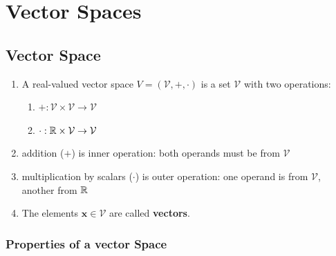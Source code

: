 \chapter{Vector Spaces}


\section{Vector Space}

\begin{enumerate}
    \item
    \begin{definition}
        A real-valued vector space $V = (\mathcal{V}, +, \cdot)$ is a set $\mathcal{V}$ with two operations:
        \hfill \cite{mfml/book/mml/Deisenroth-Faisal-Ong}
        \begin{enumerate}
            \item[] $+ :  \mathcal{V} \times \mathcal{V} \to \mathcal{V}$
            \hfill \cite{mfml/book/mml/Deisenroth-Faisal-Ong}

            \item[] $\cdot: \mathbb{R} \times \mathcal{V} \to \mathcal{V}$
            \hfill \cite{mfml/book/mml/Deisenroth-Faisal-Ong}
        \end{enumerate}
    \end{definition}


    \item addition ($+$) is inner operation: both operands must be from $\mathcal{V}$
    \hfill \cite{mfml/book/mml/Deisenroth-Faisal-Ong}

    \item multiplication by scalars ($\cdot$) is outer operation: one operand is from $\mathcal{V}$, another from $\mathbb{R}$
    \hfill \cite{mfml/book/mml/Deisenroth-Faisal-Ong}

    \item The elements $\bm{x} \in \mathcal{V}$ are called \textbf{vectors}.
    \hfill \cite{mfml/book/mml/Deisenroth-Faisal-Ong}
\end{enumerate}


\subsection{Properties of a vector Space}

